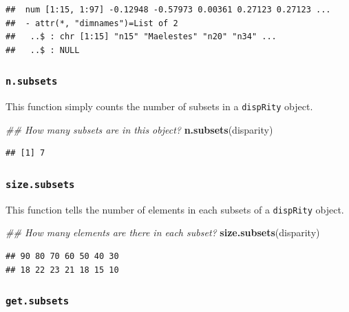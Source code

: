 \documentclass[
]{book}
\newenvironment{Shaded}{\begin{snugshade}}{\end{snugshade}}
\newcommand{\CommentTok}[1]{\textcolor[rgb]{0.56,0.35,0.01}{\textit{#1}}}
\newcommand{\KeywordTok}[1]{\textcolor[rgb]{0.13,0.29,0.53}{\textbf{#1}}}
\newcommand{\NormalTok}[1]{#1}
\begin{document}
\begin{verbatim}
##  num [1:15, 1:97] -0.12948 -0.57973 0.00361 0.27123 0.27123 ...
##  - attr(*, "dimnames")=List of 2
##   ..$ : chr [1:15] "n15" "Maelestes" "n20" "n34" ...
##   ..$ : NULL
\end{verbatim}

\hypertarget{n.subsets}{%
\subsubsection{\texorpdfstring{\texttt{n.subsets}}{n.subsets}}\label{n.subsets}}

This function simply counts the number of subsets in a \texttt{dispRity} object.

\begin{Shaded}
\begin{Highlighting}[]
\CommentTok{\#\# How many subsets are in this object?}
\KeywordTok{n.subsets}\NormalTok{(disparity)}
\end{Highlighting}
\end{Shaded}

\begin{verbatim}
## [1] 7
\end{verbatim}

\hypertarget{size.subsets}{%
\subsubsection{\texorpdfstring{\texttt{size.subsets}}{size.subsets}}\label{size.subsets}}

This function tells the number of elements in each subsets of a \texttt{dispRity} object.

\begin{Shaded}
\begin{Highlighting}[]
\CommentTok{\#\# How many elements are there in each subset?}
\KeywordTok{size.subsets}\NormalTok{(disparity)}
\end{Highlighting}
\end{Shaded}

\begin{verbatim}
## 90 80 70 60 50 40 30 
## 18 22 23 21 18 15 10
\end{verbatim}

\hypertarget{get.subsets}{%
\subsubsection{\texorpdfstring{\texttt{get.subsets}}{get.subsets}}\label{get.subsets}}
\end{document}
